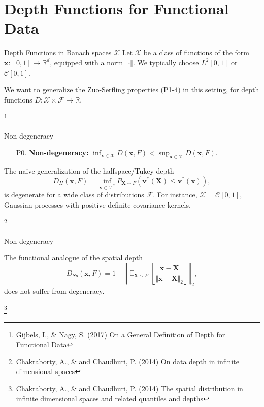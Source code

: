 \documentclass[handout, notes]{beamer}
\newcommand{\R}{\mathbb{R}}
\newcommand{\vx}{\bm{x}}
\newcommand{\vX}{\bm{X}}
\newcommand{\vv}{\bm{v}}
\DeclareMathOperator{\E}{\mathbb{E}}
\newcommand{\norm}[1]{\Vert #1 \Vert}
\newcommand\blfootnote[1]{%
  \begingroup
  \renewcommand\thefootnote{}\footnote{#1}%
  \addtocounter{footnote}{-1}%
  \endgroup
}
\begin{document}
    \section{Depth Functions for Functional Data}

    \begin{frame}{Depth Functions in Banach spaces $\mathscr{X}$}
        Let $\mathscr{X}$ be a class of functions of the form $\vx\colon [0,
        1] \to \R^d$, equipped with a norm $\norm{\cdot}$.
        We typically choose $L^2[0, 1]$ or $\mathcal{C}[0, 1]$.

        We want to generalize the Zuo-Serfling properties (P1-4) in this
        setting, for depth functions $D\colon \mathscr{X} \times \mathscr{F}
        \to \R$.

        \blfootnote{
            Gijbels, I., \& Nagy, S. (2017) On a General Definition of Depth
            for Functional Data
        }
    \end{frame}


    \begin{frame}{Non-degeneracy}
        \begin{enumerate}
            \item[P0.] \textbf{Non-degeneracy:} $\inf_{\vx \in \mathscr{X}} D(\vx, F) < \sup_{\vx \in \mathscr{X}} D(\vx, F)$.
        \end{enumerate}

        The na\"ive generalization of the halfspace/Tukey depth \[
            D_H(\vx, F) = \inf_{\vv \in \mathscr{X}^*} P_{\vX \sim F}(\vv^*(\vX) \leq \vv^*(\vx)),
        \] is degenerate for a wide class of distributions $\mathscr{F}$.
        For instance, $\mathscr{X} = \mathcal{C}[0, 1]$, Gaussian processes with
        positive definite covariance kernels.

        \blfootnote{
            Chakraborty, A., \& and Chaudhuri, P. (2014) On data depth in
            infinite dimensional spaces
        }
    \end{frame}


    \begin{frame}{Non-degeneracy}

        The functional analogue of the spatial depth \[
            D_{Sp}(\vx, F) = 1 - \left\Vert\E_{\vX \sim F}\left[\frac{\vx - \vX}{\norm{\vx - \vX}_2}\right]\right\Vert_2,
        \] does not suffer from degeneracy.


        \blfootnote{
            Chakraborty, A., \& and Chaudhuri, P. (2014) The spatial
            distribution in infinite dimensional spaces and related quantiles
            and depths
        }
    \end{frame}
\end{document}
